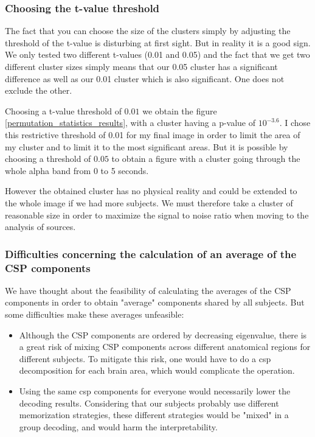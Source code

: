 
\subsubsection{Choosing the t-value threshold}

The fact that you can choose the size of the clusters simply by adjusting the threshold of the t-value is disturbing at first sight. But in reality it is a good sign. We only tested two different t-values (0.01 and 0.05) and the fact that we get two different cluster sizes simply means that our 0.05 cluster has a significant difference as well as our 0.01 cluster which is also significant. One does not exclude the other.

Choosing a t-value threshold of $0.01$ we obtain the figure \ref{permutation_statistics_results}, with a cluster having a p-value of $10^{-3.6}$. I chose this restrictive threshold of 0.01 for my final image in order to limit the area of my cluster and to limit it to the most significant areas. But it is possible by choosing a threshold of $0.05$ to obtain a figure with a cluster going through the whole alpha band from 0 to 5 seconds.

However the obtained cluster has no physical reality and could be extended to the whole image if we had more subjects. We must therefore take a cluster of reasonable size in order to maximize the signal to noise ratio when moving to the analysis of sources.


\subsubsection{Difficulties concerning the calculation of an average of the CSP components}
\label{section:csp_average_difficulty}

We have thought about the feasibility of calculating the averages of the CSP components in order to obtain "average" components shared by all subjects. But some difficulties make these averages unfeasible:
\begin{itemize}
    \item Although the CSP components are ordered by decreasing eigenvalue, there is a great risk of mixing CSP components across different anatomical regions for different subjects. To mitigate this risk, one would have to do a csp decomposition for each brain area, which would complicate the operation.
    \item Using the same csp components for everyone would necessarily lower the decoding results. Considering that our subjects probably use different memorization strategies, these different strategies would be "mixed" in a group decoding, and would harm the interpretability.
\end{itemize}

